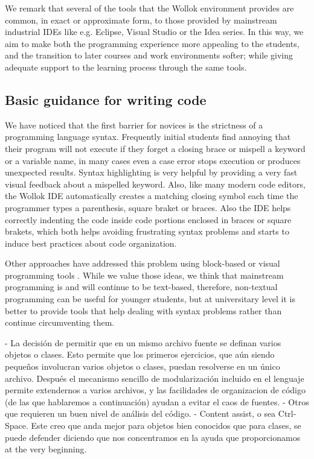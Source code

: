 We remark that several of the tools that the Wollok environment provides are common, in exact or approximate form, to those provided by mainstream industrial IDEs like e.g. Eclipse, Visual Studio or the Idea series. In this way, we aim to make both the programming experience more appealing to the students, and the transition to later courses and work environments softer; while giving adequate support to the learning process through the same tools.

\subsection{Basic guidance for writing code}
We have noticed that the first barrier for novices is the strictness of a programming language syntax. Frequently initial students find annoying that their program will not execute if they forget a closing brace or mispell a keyword or a variable name, in many cases even a case error stops execution or produces unexpected results.
Syntax highlighting is very helpful by providing a very fast visual feedback about a mispelled keyword.
Also, like many modern code editors, the Wollok IDE automatically creates a matching closing symbol each time the programmer types a parenthesis, square braket or braces. 
Also the IDE helps correctly indenting the code inside code portions enclosed in braces or square brakets, which both helps avoiding frustrating syntax problems and starts to induce best practices about code organization.

Other approaches have addressed this problem using block-based or visual programming tools . 
While we value those ideas, we think that mainstream programming is and will continue to be text-based, therefore, non-textual programming can be useful for younger students, but at universitary level it is better to provide tools that help dealing with syntax problems rather than continue circumventing them.


  - La decisión de permitir que en un mismo archivo fuente se definan varios objetos o clases. Esto permite que los primeros ejercicios, que aún siendo pequeños involucran varios objetos o clases, puedan resolverse en un único archivo. Después el mecanismo sencillo de modularización incluido en el lenguaje permite extendernos a varios archivos, y las facilidades de organizacion de código (de las que hablaremos a continuación) ayudan a evitar el caos de fuentes.
- Otros que requieren un buen nivel de análisis del código.
  - Content assist, o sea Ctrl-Space. Este creo que anda mejor para objetos bien conocidos que para clases, se puede defender diciendo que nos concentramos en la ayuda que proporcionamos at the very beginning.
 

